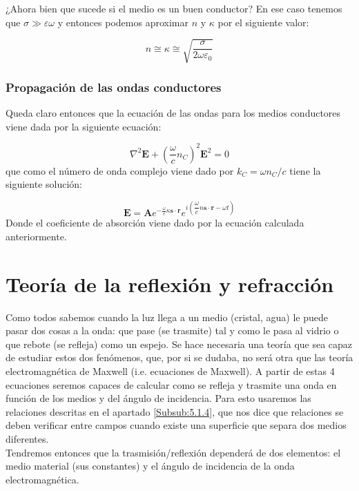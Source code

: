 \documentclass[12pt,a4paper]{article}
\newcommand{\parentesis}[1]{\left( #1  \right)}
\newcommand{\En}{\mathbf{E}}
\newcommand{\rn}{\mathbf{r}}
\newcommand{\An}{\mathbf{A}}
\newcommand{\sn}{\mathbf{s}}
\numberwithin{equation}{section}
\numberwithin{figure}{section}
\begin{document}
¿Ahora bien que sucede si el medio es un buen conductor? En ese caso tenemos que $\sigma \gg \varepsilon \omega$ y entonces podemos aproximar $n$ y $\kappa$ por el siguiente valor:

\begin{equation}
n \cong \kappa \cong \sqrt{\dfrac{\sigma}{2 \omega \varepsilon_0}}
\end{equation}

\subsubsection{Propagación de las ondas conductores}

Queda claro entonces que la ecuación de las ondas para los medios conductores viene dada por la siguiente ecuación:

\begin{equation}
\nabla^2 \En + \parentesis{\dfrac{\omega}{c}n_C}^2\En^2= 0
\end{equation}
que como el número de onda complejo viene dado por $k_C = \omega n_C / c$ tiene la siguiente solución:

\begin{equation}
\En = \An e^{- \frac{\omega}{c} \kappa \sn \cdot \rn} e^{i \parentesis{\dfrac{\omega}{c} n \sn \cdot \rn - \omega t}}
\end{equation}
Donde el coeficiente de absorción viene dado por la ecuación calculada anteriormente.  \newpage

\section{Teoría de la reflexión y refracción}


Como todos sabemos cuando la luz llega a un medio (cristal, agua) le puede pasar dos cosas a la onda: que pase (se trasmite) tal y como le pasa al vidrio o que rebote (se refleja) como un espejo. Se hace necesaria una teoría que sea capaz de estudiar estos dos fenómenos, que, por si se dudaba, no será otra que las teoría electromagnética de Maxwell (i.e. ecuaciones de Maxwell).
A partir de estas 4 ecuaciones seremos capaces de calcular como se refleja y trasmite una onda en función de los medios y del ángulo de incidencia. Para esto usaremos las relaciones descritas en el apartado \ref{Subsub:5.1.4}, que nos dice que relaciones se deben verificar entre campos cuando existe una superficie que separa dos medios diferentes. \\

Tendremos entonces que la trasmisión/reflexión dependerá de dos elementos: el medio material (sus constantes) y el ángulo de incidencia de la onda electromagnética. 
\end{document}
